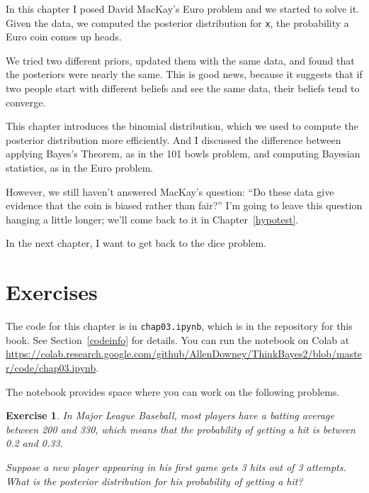 \documentclass[12pt]{book}
\theoremstyle{exercise}
\newtheorem{exercise}{Exercise}[chapter]
\newcommand{\py}[1]{{\tt #1}}%
\begin{document}
In this chapter I posed David MacKay's Euro problem and we started to solve it.
Given the data, we computed the posterior distribution for \py{x}, the probability a Euro coin comes up heads.

We tried two different priors, updated them with the same data, and found that the posteriors were nearly the same.
This is good news, because it suggests that if two people start with different beliefs and see the same data, their beliefs tend to converge.

This chapter introduces the binomial distribution, which we used to compute the posterior distribution more efficiently.
And I discussed the difference between applying Bayes's Theorem, as in the 101 bowls problem, and computing Bayesian statistics, as in the Euro problem.


However, we still haven't answered MacKay's question: ``Do these data give evidence that the coin is biased rather than fair?''
I'm going to leave this question hanging a little longer; we'll come back to it in Chapter~\ref{hypotest}.

In the next chapter, I want to get back to the dice problem.

\section{Exercises}

The code for this chapter is in \py{chap03.ipynb}, which is in the repository for this book.  See Section~\ref{codeinfo} for details.
You can run the notebook on Colab at \url{https://colab.research.google.com/github/AllenDowney/ThinkBayes2/blob/master/code/chap03.ipynb}.

The notebook provides space where you can work on the following problems.


\begin{exercise}
In Major League Baseball, most players have a batting average between 200 and 330, which means that the probability of getting a hit is between 0.2 and 0.33.

Suppose a new player appearing in his first game gets 3 hits out of 3 attempts.  What is the posterior distribution for his probability of getting a hit?
\end{exercise}
\end{document}
